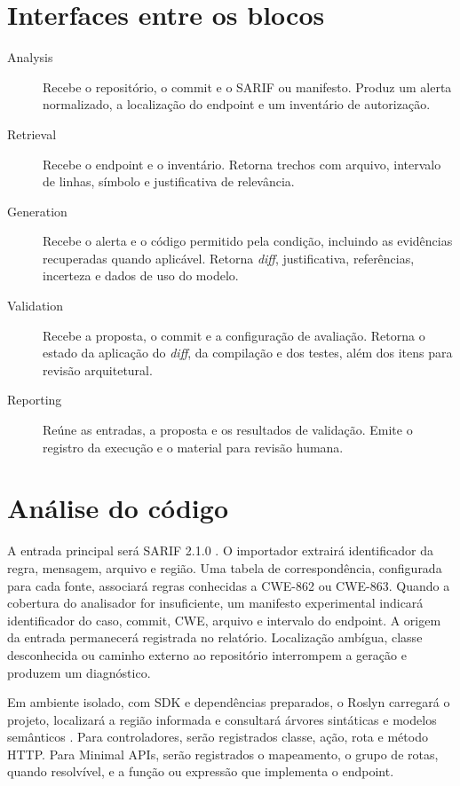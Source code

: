 \section{Interfaces entre os blocos}

\begin{description}
    \item[Analysis] Recebe o repositório, o commit e o SARIF ou manifesto. Produz um alerta normalizado, a localização do endpoint e um inventário de autorização.
    \item[Retrieval] Recebe o endpoint e o inventário. Retorna trechos com arquivo, intervalo de linhas, símbolo e justificativa de relevância.
    \item[Generation] Recebe o alerta e o código permitido pela condição, incluindo as evidências recuperadas quando aplicável. Retorna \textit{diff}, justificativa, referências, incerteza e dados de uso do modelo.
    \item[Validation] Recebe a proposta, o commit e a configuração de avaliação. Retorna o estado da aplicação do \textit{diff}, da compilação e dos testes, além dos itens para revisão arquitetural.
    \item[Reporting] Reúne as entradas, a proposta e os resultados de validação. Emite o registro da execução e o material para revisão humana.
\end{description}

\section{Análise do código}

A entrada principal será SARIF 2.1.0 \cite{githubsarif}. O importador extrairá identificador da regra, mensagem, arquivo e região. Uma tabela de correspondência, configurada para cada fonte, associará regras conhecidas a CWE-862 ou CWE-863. Quando a cobertura do analisador for insuficiente, um manifesto experimental indicará identificador do caso, commit, CWE, arquivo e intervalo do endpoint. A origem da entrada permanecerá registrada no relatório. Localização ambígua, classe desconhecida ou caminho externo ao repositório interrompem a geração e produzem um diagnóstico.

Em ambiente isolado, com SDK e dependências preparados, o Roslyn carregará o projeto, localizará a região informada e consultará árvores sintáticas e modelos semânticos \cite{roslyn}. Para controladores, serão registrados classe, ação, rota e método HTTP. Para Minimal APIs, serão registrados o mapeamento, o grupo de rotas, quando resolvível, e a função ou expressão que implementa o endpoint.

